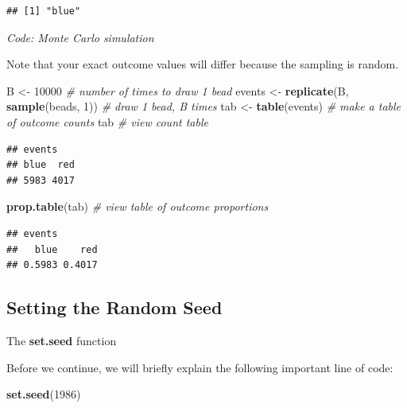\documentclass[
]{article}
\newenvironment{Shaded}{\begin{snugshade}}{\end{snugshade}}
\newcommand{\CommentTok}[1]{\textcolor[rgb]{0.56,0.35,0.01}{\textit{#1}}}
\newcommand{\DecValTok}[1]{\textcolor[rgb]{0.00,0.00,0.81}{#1}}
\newcommand{\KeywordTok}[1]{\textcolor[rgb]{0.13,0.29,0.53}{\textbf{#1}}}
\newcommand{\NormalTok}[1]{#1}
\newcommand{\StringTok}[1]{\textcolor[rgb]{0.31,0.60,0.02}{#1}}
\begin{document}
\begin{verbatim}
## [1] "blue"
\end{verbatim}

\emph{Code: Monte Carlo simulation}

Note that your exact outcome values will differ because the sampling is
random.

\begin{Shaded}
\begin{Highlighting}[]
\NormalTok{B \textless{}{-}}\StringTok{ }\DecValTok{10000}    \CommentTok{\# number of times to draw 1 bead}
\NormalTok{events \textless{}{-}}\StringTok{ }\KeywordTok{replicate}\NormalTok{(B, }\KeywordTok{sample}\NormalTok{(beads, }\DecValTok{1}\NormalTok{))    }\CommentTok{\# draw 1 bead, B times}
\NormalTok{tab \textless{}{-}}\StringTok{ }\KeywordTok{table}\NormalTok{(events)    }\CommentTok{\# make a table of outcome counts}
\NormalTok{tab    }\CommentTok{\# view count table}
\end{Highlighting}
\end{Shaded}

\begin{verbatim}
## events
## blue  red 
## 5983 4017
\end{verbatim}

\begin{Shaded}
\begin{Highlighting}[]
\KeywordTok{prop.table}\NormalTok{(tab)    }\CommentTok{\# view table of outcome proportions}
\end{Highlighting}
\end{Shaded}

\begin{verbatim}
## events
##   blue    red 
## 0.5983 0.4017
\end{verbatim}

\hypertarget{setting-the-random-seed}{%
\subsection{Setting the Random Seed}\label{setting-the-random-seed}}

The \textbf{set.seed} function

Before we continue, we will briefly explain the following important line
of code:

\begin{Shaded}
\begin{Highlighting}[]
\KeywordTok{set.seed}\NormalTok{(}\DecValTok{1986}\NormalTok{)}
\end{Highlighting}
\end{Shaded}
\end{document}
